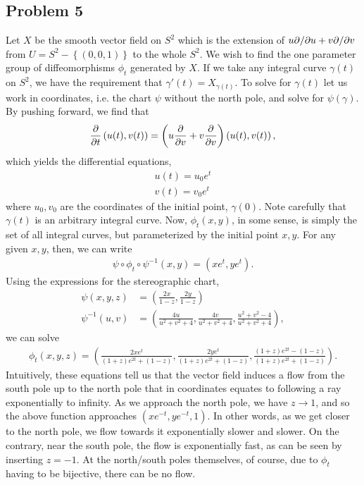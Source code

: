 \documentclass{../../mathnotes}
\begin{document}
\subsection*{Problem 5}

Let $X$ be the smooth vector field on $S^2$ which is the extension of $u\partial/\partial u+v\partial/\partial v$ from
$U=S^2-\left\{ \left( 0,0,1 \right) \right\}$ to the whole $S^2$. We wish to find the one parameter
group of diffeomorphisms $\phi_t$ generated by $X$. If we take any integral curve $\gamma(t)$ on $S^2$,
we have the requirement that $\gamma'(t)=X_{\gamma(t)}$. To solve for $\gamma(t)$ let us work in coordinates,
i.e. the chart $\psi$ without the north pole, and solve for $\psi(\gamma)$. By pushing forward, we find that
\begin{align*}
    \frac{\partial}{\partial t}\left( u(t),v(t) \right)=\left( u\frac{\partial}{\partial v}+v\frac{\partial}{\partial v} \right)\left( u(t),v(t) \right),
\end{align*}
which yields the differential equations,
\begin{align*}
    u(t)=u_0 e^t\\
    v(t)=v_0 e^t
\end{align*}
where $u_0,v_0$ are the coordinates of the initial point, $\gamma(0)$. Note carefully that $\gamma(t)$
is an arbitrary integral curve. Now, $\phi_t(x,y)$, in some sense, is simply the set of all integral curves, but
parameterized by the initial point $x,y$. 
For any given $x,y$, then, we can write
\begin{align*}
    \psi\circ\phi_t\circ\psi^{-1}(x,y)=(x e^t, y e^t).
\end{align*}
Using the expressions for the stereographic chart,
\begin{align*}
    \psi(x,y,z)&=\left( \frac{2x}{1-z},\frac{2y}{1-z} \right)\\
    \psi^{-1}(u,v)&=\left( \frac{4u}{u^2+v^2+4}, \frac{4v}{u^2+v^2+4},\frac{u^2+v^2-4}{u^2+v^2+4} \right),
\end{align*}
we can solve
\begin{align*}
    \phi_t(x,y,z)=\left( \frac{2x e^t}{(1+z)e^{2t}+(1-z)},\frac{2y e^t}{(1+z)e^{2t}+(1-z)},\frac{(1+z)e^{2t}-(1-z)}{(1+z)e^{2t}+(1-z)} \right).
\end{align*}
Intuitively, these equations tell us that the vector field induces a flow from the south pole up to the north pole
that in coordinates equates to following a ray exponentially to infinity.
As we approach the north pole, we have $z\to 1$, and so the above function approaches $(xe^{-t},ye^{-t},1)$. In other
words, as we get closer to the north pole, we flow towards it exponentially slower and slower. 
On the contrary, near the south pole, the flow is exponentially fast, as can be seen by inserting $z=-1$.
At the north/south poles themselves, of course, due to $\phi_t$ having to be bijective, there can be no flow.
\end{document}
